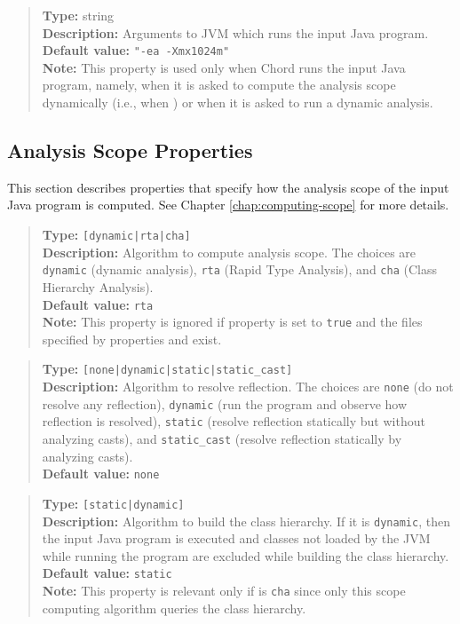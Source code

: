 \begin{quote}
{\bf Type:} string \\
{\bf Description:} Arguments to JVM which runs the input Java program. \\
{\bf Default value:} {\tt "-ea -Xmx1024m"} \\
{\bf Note:} This property is used only when Chord runs the input Java program, namely, when it is asked to compute the analysis scope dynamically (i.e., when ) or when it is asked to run a dynamic analysis. 
\end{quote}

\subsection{Analysis Scope Properties}
\label{sec:scope-props}

This section describes properties that specify how the analysis scope of the input Java program is computed.
See Chapter \ref{chap:computing-scope} for more details.

\begin{quote}
{\bf Type:} {\tt [dynamic|rta|cha]} \\
{\bf Description:} Algorithm to compute analysis scope.  The choices are {\tt dynamic} (dynamic analysis), {\tt rta} (Rapid Type Analysis), and {\tt cha} (Class Hierarchy Analysis). \\
{\bf Default value:} {\tt rta} \\
{\bf Note:} This property is ignored if property  is set to {\tt true} and the files specified by properties  and  exist. 
\end{quote}

\begin{quote}
{\bf Type:} {\tt [none|dynamic|static|static\_cast]} \\
{\bf Description:} Algorithm to resolve reflection.  The choices are {\tt none} (do not resolve any reflection),
{\tt dynamic} (run the program and observe how reflection is resolved),
{\tt static} (resolve reflection statically but without analyzing casts), and
{\tt static\_cast} (resolve reflection statically by analyzing casts). \\
{\bf Default value:} {\tt none}
\end{quote}

\begin{quote}
{\bf Type:} {\tt [static|dynamic]} \\
{\bf Description:} Algorithm to build the class hierarchy.  If it is {\tt dynamic}, then the input Java program is executed
and classes not loaded by the JVM while running the program are excluded while building the class hierarchy. \\
{\bf Default value:} {\tt static} \\
{\bf Note:} This property is relevant only if  is {\tt cha} since only this
scope computing algorithm queries the class hierarchy. 
\end{quote}


